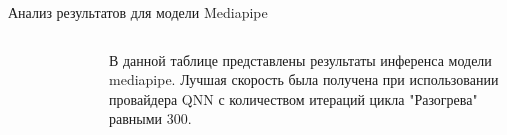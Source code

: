 \documentclass[aspectratio=169,xcolor=dvipsnames]{beamer}
\begin{document}
\begin{frame}{Анализ результатов для модели Mediapipe}
    \begin{columns}[c] %

        \begin{figure}[h]
            \label{ris:mediapipe}
        \end{figure}

        В данной таблице представлены результаты инференса модели mediapipe. Лучшая скорость была получена при использовании провайдера QNN с количеством итераций цикла "Разогрева" равными 300.

    \end{columns}
\end{frame}

\end{document}
